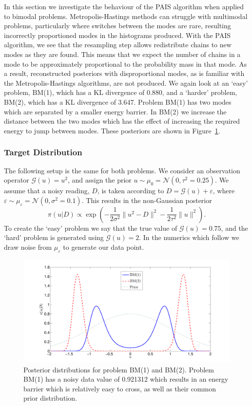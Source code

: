 \documentclass[final]{siamltex}
\newcommand{\G}{\mathcal{G}}
\newcommand{\N}{\mathcal{N}}
\begin{document}
In this section we investigate the behaviour of the PAIS algorithm
when applied to bimodal problems. Metropolis-Hastings methods can
struggle with multimodal problems, particularly where switches between
the modes are rare, resulting incorrectly proportioned modes in the
histograms produced. With the PAIS algorithm, we see that the
resampling step allows redistribute chains to new modes as they are
found. This means that we expect the number of chains in a mode to be
approximately proportional to the probability mass in that mode. As a result, reconstructed posteriors with disproportional modes, as is familiar with the Metropolis-Hastings algorithms, are not produced. We again look at an `easy' problem, BM(1), which has a KL divergence of 0.880, and a `harder' problem, BM(2), which has a KL divergence of 3.647. Problem BM(1) has two modes which are separated by a smaller energy barrier. In BM(2) we increase the distance between the two modes which has the effect of increasing the required energy to jump between modes. These posteriors are shown in Figure~\ref{fig:problem 3 posteriors}.

\subsubsection{Target Distribution}

The following setup is the same for both problems. We consider an observation operator $\G(u) = u^2$, and assign the prior $u \sim \mu_0 = \N(0, \tau^2=0.25)$. We assume that a noisy reading, $D$, is taken according to $D = \G(u) + \varepsilon$, where $\varepsilon \sim \mu_\varepsilon = \N(0, \sigma^2 = 0.1)$. This results in the non-Gaussian posterior
\[
	\pi(u|D) \propto \exp\left(-\frac{1}{2\sigma^2}\|u^2 - D\|^2 - \frac{1}{2\tau^2}\|u\|^2\right).
\]
To create the `easy' problem we say that the true value of $\G(u) = 0.75$, and the `hard' problem is generated using $\G(u) = 2$. In the numerics which follow we draw noise from $\mu_\varepsilon$ to generate our data point.

\begin{figure}[htpb]
\begin{center}
\includegraphics[width=\textwidth]{"figures/posteriors3"}
\caption{Posterior distributions for problem BM(1) and BM(2). Problem BM(1) has a noisy data value of  0.921312 which results in an energy barrier which is relatively easy to cross, as well as their common prior distribution.}
\label{fig:problem 3 posteriors}
\end{center}
\end{figure}
\end{document}
